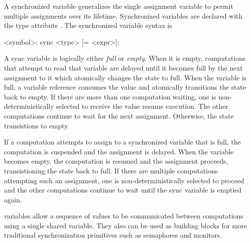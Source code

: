 A synchronized variable generalizes the single assignment variable to
permit multiple assignments over its lifetime. Synchronized variables
are declared with the type attribute . The synchronized
variable syntax is
\begin{chapel}
[var] <symbol>: sync <type> [= <expr>];
\end{chapel}
A sync variable is logically either {\em full} or {\em empty}. When it
is empty, computations that attempt to read that variable are delayed
until it becomes full by the next assignment to it which atomically
changes the state to full. When the variable is full, a variable
reference consumes the value and atomically transitions the state back
to empty. If there are more than one computation waiting, one is
non-deterministically selected to receive the value resume execution.
The other computations continue to wait for the next
assignment. Otherwise, the state transistions to empty. 

If a computation attempts to assign to a synchronized variable that is
full, the computation is suspended and the assignment is delayed. When
the variable becomes empty, the computation is resumed and the
assignment proceeds, transistioning the state back to full. If there
are multiple computations attempting such an assignment, one is
non-deterministically selected to proceed and the other computations
continue to wait until the sync variable is emptied again.

 variables allow a sequence of values to be communicated
between computations using a single shared variable. They also can be
used as building blocks for more traditional synchronization
primitives such as semaphores and monitors.
